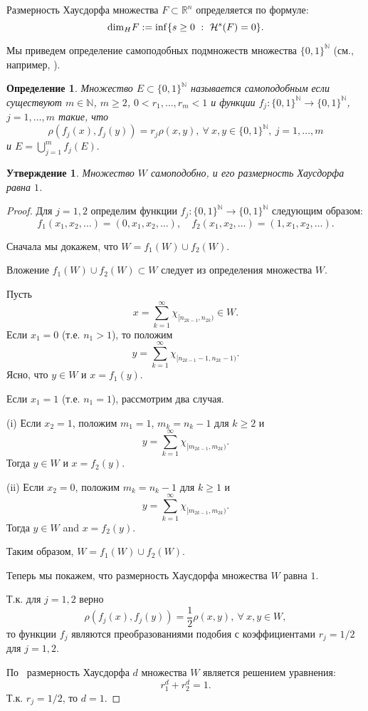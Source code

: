 \documentclass[12pt]{article}
\newtheorem{prop}[thm]{Утверждение}
\newtheorem{dfn}[thm]{Определение}
\def\N{{\mathbb{N}}}
\begin{document}
Размерность Хаусдорфа множества  $F\subset \mathbb R^n$ определяется по формуле:
$${\rm dim}_H F := \inf\{ s\ge 0 \ : \ \mathcal H^s(F)=0\}.$$



 Мы приведем определение самоподобных подмножеств множества $\{0,1\}^\N$ (см., например, \cite{falconer1997techniques}).

\begin{dfn}
Множество $E\subset\{0,1\}^\N$ называется самоподобным если существуют $m\in\N$, $m\ge2$, $0< r_1, \dots, r_m<1$ и функции $f_j : \{0,1\}^\N \to \{0,1\}^\N$, $j=1,\dots, m$ такие, что 
$$\rho(f_j(x), f_j(y)) = r_j \rho(x,y), \ \forall \ x,y \in \{0,1\}^\N, \ j=1,\dots, m$$
и $E=\bigcup_{j=1}^m f_j(E).$
\end{dfn}


\begin{prop}
Множество $W$ самоподобно, и его размерность Хаусдорфа равна $1$.
\end{prop}

\begin{proof}
Для $j=1,2$ определим функции $f_j : \{0,1\}^\N \to \{0,1\}^\N$ следующим образом:
$$f_1(x_1, x_2, \dots)=(0, x_1, x_2, \dots), \quad f_2(x_1, x_2, \dots)=(1, x_1, x_2, \dots).$$

Сначала мы докажем, что $W=f_1(W)\cup f_2(W).$

Вложение $f_1(W)\cup f_2(W) \subset W$ следует из определения множества $W$.

Пусть
$$x=\sum_{k=1}^\infty \chi_{[n_{2k-1},n_{2k})}\in W.$$
 Если $x_1=0$ (т.е. $n_1>1$), то положим
 $$y=\sum_{k=1}^\infty \chi_{[n_{2k-1}-1,n_{2k}-1)}.$$
 Ясно, что $y\in W$ и $x=f_1(y)$.

 Если $x_1=1$ (т.е. $n_1=1$), рассмотрим два случая.

 (i) Если $x_2=1$, положим $m_1=1$, $m_k=n_k-1$ для $k\ge2$ и
 $$y=\sum_{k=1}^\infty \chi_{[m_{2k-1},m_{2k})}.$$
 Тогда $y\in W$ и $x=f_2(y)$.

 (ii) Если $x_2=0$, положим $m_k=n_k-1$ для $k\ge1$ и
 $$y=\sum_{k=1}^\infty \chi_{[m_{2k-1},m_{2k})}.$$
 Тогда $y\in W$ and $x=f_2(y)$.

 Таким образом, $W=f_1(W)\cup f_2(W).$

 Теперь мы покажем, что размерность Хаусдорфа множества $W$ равна $1$.

Т.к. для $j=1,2$ верно
 $$\rho(f_j(x),f_j(y))=\frac12\rho(x,y), \ \forall \ x, y \in W,$$
 то функции $f_j$ являются преобразованиями подобия с коэффициентами $r_j=1/2$ для $j=1,2$.


По~\cite[Теорема 9.3]{Edgar} размерность Хаусдорфа $d$ множества $W$ является решением уравнения:
$$ r_1^d+r_2^d=1.$$
Т.к. $r_j=1/2$, то
$d=1.$
\end{proof}
\end{document}
